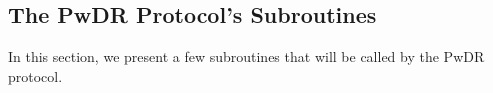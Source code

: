 
\subsection{The PwDR Protocol's Subroutines}\label{sec::PwDR-Subroutines}


In this section, we present a few subroutines that will be  called  by  the PwDR protocol. 



%
  
  

  
  
  
  
  
  
  
  
  


